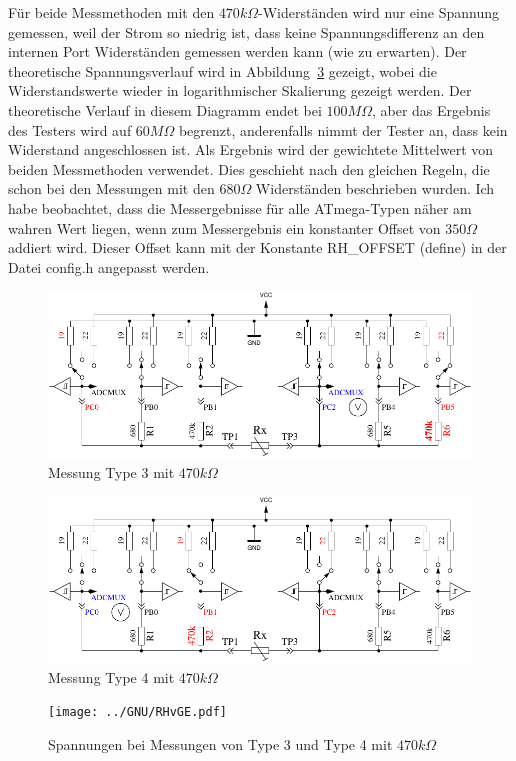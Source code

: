 Für beide Messmethoden mit den \(470k\Omega\)-Widerständen wird nur eine Spannung gemessen, weil der Strom
so niedrig ist, dass keine Spannungsdifferenz an den internen Port Widerständen gemessen werden kann (wie zu erwarten).
Der theoretische Spannungsverlauf wird in Abbildung~\ref{fig:RHv} gezeigt, wobei die Widerstandswerte wieder in
logarithmischer Skalierung gezeigt werden.
Der theoretische Verlauf in diesem Diagramm endet bei \(100M\Omega\), aber das Ergebnis des Testers wird auf
 \(60M\Omega\) begrenzt, anderenfalls nimmt der Tester an, dass kein Widerstand angeschlossen ist.
Als Ergebnis wird der gewichtete Mittelwert von beiden Messmethoden verwendet. Dies geschieht nach den gleichen Regeln, die schon bei
den Messungen mit den  \(680\Omega\) Widerständen beschrieben wurden.
Ich habe beobachtet, dass die Messergebnisse für alle ATmega-Typen  näher am wahren Wert liegen, wenn zum Messergebnis
ein konstanter Offset von \(350\Omega\) addiert wird.
Dieser Offset kann mit der Konstante RH\_OFFSET (define) in der Datei config.h angepasst werden.

\begin{figure}[H]
\centering
\includegraphics[width=.8\textwidth]{../FIG/ResistormessH1.pdf}
\caption{Messung Type 3 mit \(470k\Omega\) }
\label{fig:RH1mes}
\end{figure}

\begin{figure}[H]
 \centering
 \includegraphics[width=.8\textwidth]{../FIG/ResistormessH2.pdf}
 \caption{Messung Type 4 mit \(470k\Omega\) }
\label{fig:RH2mes}
\end{figure}

\begin{figure}[H]
\centering
\texttt{[image: ../GNU/RHvGE.pdf]}
\caption{Spannungen bei Messungen von Type 3 und Type 4  mit \(470k\Omega\) }
\label{fig:RHv}
\end{figure}

